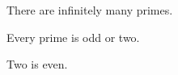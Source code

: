 \documentclass{article}
\theoremstyle{remark}
\begin{document}
\begin{theorem}
There are infinitely many primes.
\end{theorem}
\begin{lemma}
Every prime is odd or two.
\end{lemma}
\begin{note}
Two is even.
\end{note}
\end{document}
